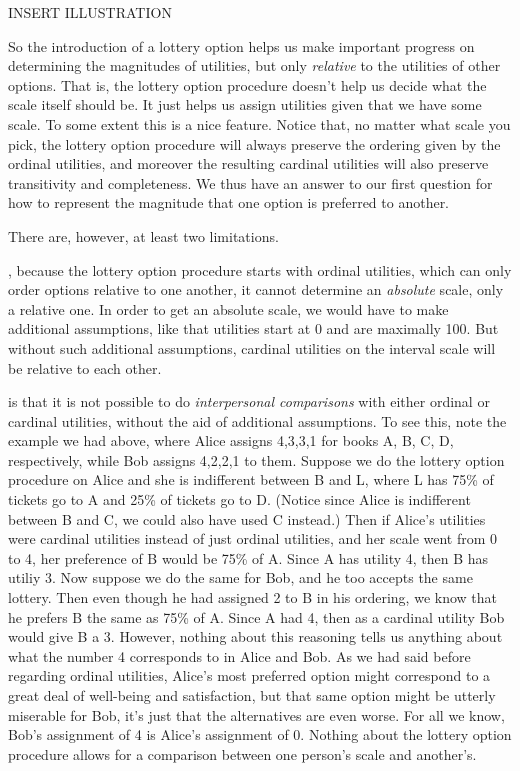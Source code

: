 \documentclass[]{tufte-book}
\begin{document}
INSERT ILLUSTRATION

So the introduction of a lottery option helps us make important progress on determining the magnitudes of utilities, but only \emph{relative} to the utilities of other options. That is, the lottery option procedure doesn't help us decide what the scale itself should be. It just helps us assign utilities given that we have some scale. To some extent this is a nice feature. Notice that, no matter what scale you pick, the lottery option procedure will always preserve the ordering given by the ordinal utilities, and moreover the resulting cardinal utilities will also preserve transitivity and completeness. We thus have an answer to our first question for how to represent the magnitude that one option is preferred to another.

There are, however, at least two limitations.

, because the lottery option procedure starts with ordinal utilities, which can only order options relative to one another, it cannot determine an \emph{absolute} scale, only a relative one. In order to get an absolute scale, we would have to make additional assumptions, like that utilities start at 0 and are maximally 100. But without such additional assumptions, cardinal utilities on the interval scale will be relative to each other.

 is that it is not possible to do \emph{interpersonal comparisons} with either ordinal or cardinal utilities, without the aid of additional assumptions. To see this, note the example we had above, where Alice assigns 4,3,3,1 for books A, B, C, D, respectively, while Bob assigns 4,2,2,1 to them. Suppose we do the lottery option procedure on Alice and she is indifferent between B and L, where L has 75\% of tickets go to A and 25\% of tickets go to D. (Notice since Alice is indifferent between B and C, we could also have used C instead.) Then if Alice's utilities were cardinal utilities instead of just ordinal utilities, and her scale went from 0 to 4, her preference of B would be 75\% of A. Since A has utility 4, then B has utiliy 3. Now suppose we do the same for Bob, and he too accepts the same lottery. Then even though he had assigned 2 to B in his ordering, we know that he prefers B the same as 75\% of A. Since A had 4, then as a cardinal utility Bob would give B a 3. However, nothing about this reasoning tells us anything about what the number 4 corresponds to in Alice and Bob. As we had said before regarding ordinal utilities, Alice's most preferred option might correspond to a great deal of well-being and satisfaction, but that same option might be utterly miserable for Bob, it's just that the alternatives are even worse. For all we know, Bob's assignment of 4 is Alice's assignment of 0. Nothing about the lottery option procedure allows for a comparison between one person's scale and another's.
\end{document}
